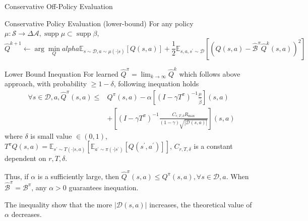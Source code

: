 \documentclass[11pt]{beamer}
\newcommand{\mbb}[1]{\mathbb{#1}}
\newcommand{\mc}[1]{\mathcal{#1}}
\newcommand{\abs}[1]{\left\lvert #1 \right\rvert}
\newcommand{\supp}{\operatorname{supp}}
\begin{document}
\begin{frame}{Conservative Off-Policy Evaluation}
  \begin{block}{Conservative Policy Evaluation (lower-bound)}
    For any policy $\mu : \mc{S} \to \Delta{\mc{A}}, \supp \mu \subset \supp \beta$,
    \[
      \hat{Q}^{k+1} \leftarrow \arg \min_{Q} alpha \mbb{E}_{s \sim \mc{D}, a \sim \mu(\cdot|s)}[Q(s,a)] + \frac{1}{2} \mbb{E}_{s,a, s^\prime \sim \mc{D}} \left[\left(Q(s,a) - \hat{\mc{B}}^\pi \hat{Q}^k (s,a)\right)^2\right]
    \]
  \end{block}
  
  \begin{block}{Lower Bound Inequation}
    For learned $\hat{Q}^\pi = \lim_{k \to \infty} \hat{Q}^k$ which follows above approach, with probability $\geq 1-\delta$, following inequation holds
    \[
    \begin{aligned}
      \forall s \in \mc{D}, a, \hat{Q}^\pi(s,a) \leq &Q^\pi(s,a) - \alpha \left[(I - \gamma T^\pi)^{-1} \frac{\mu}{\hat{\beta}}\right](s,a) \\
      &+\left[(I-\gamma T^\pi)^{-1} \frac{C_{r,T,\delta}R_{\text{max}}}{(1-\gamma)\sqrt{\abs{\mc{D}(s,a)}}}\right](s,a)
    \end{aligned}
    \]
    where $\delta$ is small value $\in (0,1)$, $T^\pi Q(s,a)= \mbb{E}_{s^\prime \sim T(\cdot|s,a)}[\mbb{E}_{a^\prime \sim \pi(\cdot|s^\prime)}[Q(s^\prime,a^\prime)]]$, $C_{r,T,\delta}$ is a constant dependent on $r, T, \delta$.

    Thus, if $\alpha$ is a sufficiently large, then $\hat{Q}^\pi (s,a) \leq Q^\pi(s,a), \forall s\in \mc{D},a$.
    When $\hat{\mc{B}}^\pi = \mc{B}^\pi$, any $\alpha > 0$ guarantees inequation.
  \end{block}
    The inequality show that the more $\abs{\mc{D}(s,a)}$ increases, the theoretical value of $\alpha$ decreases.
\end{frame}
\end{document}
